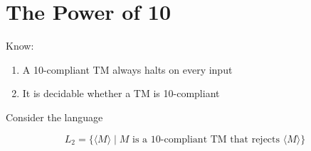 \documentclass{article}
\begin{document}
    \section{The Power of 10}

    Know:
    \begin{enumerate}[-]
        \item A 10-compliant TM always halts on every input
            
        \item It is decidable whether a TM is 10-compliant
    \end{enumerate}

    Consider the language

    \begin{equation*}
        L_2 = \{\langle M \rangle \mid M \text{ is a 10-compliant TM that rejects } \langle M \rangle\}
    \end{equation*}
\end{document}
